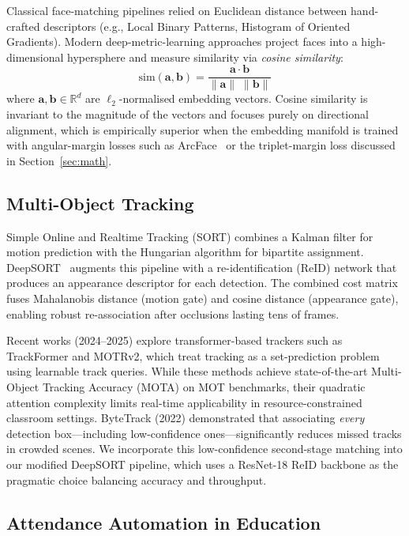 \documentclass[conference, 10pt]{IEEEtran}
\begin{document}
Classical face-matching pipelines relied on Euclidean distance between hand-crafted descriptors
(e.g., Local Binary Patterns, Histogram of Oriented Gradients).  Modern deep-metric-learning
approaches project faces into a high-dimensional hypersphere and measure similarity via
\emph{cosine similarity}:
\begin{equation}
\label{eq:cosine}
    \text{sim}(\mathbf{a}, \mathbf{b})
    = \frac{\mathbf{a} \cdot \mathbf{b}}{\|\mathbf{a}\| \; \|\mathbf{b}\|}
\end{equation}
where $\mathbf{a}, \mathbf{b} \in \mathbb{R}^{d}$ are $\ell_2$-normalised embedding vectors.
Cosine similarity is invariant to the magnitude of the vectors and focuses purely on
directional alignment, which is empirically superior when the embedding manifold is trained
with angular-margin losses such as ArcFace~\cite{ref_arcface} or the triplet-margin loss
discussed in Section~\ref{sec:math}.

\subsection{Multi-Object Tracking}

Simple Online and Realtime Tracking (SORT) combines a Kalman filter for motion prediction with
the Hungarian algorithm for bipartite assignment.  DeepSORT~\cite{ref_deepsort} augments this
pipeline with a re-identification (ReID) network that produces an appearance descriptor for
each detection.  The combined cost matrix fuses Mahalanobis distance (motion gate) and cosine
distance (appearance gate), enabling robust re-association after occlusions lasting tens of
frames.

Recent works (2024--2025) explore transformer-based trackers such as TrackFormer and MOTRv2,
which treat tracking as a set-prediction problem using learnable track queries.  While these
methods achieve state-of-the-art Multi-Object Tracking Accuracy (MOTA) on MOT benchmarks,
their quadratic attention complexity limits real-time applicability in resource-constrained
classroom settings.  ByteTrack (2022) demonstrated that associating \emph{every} detection
box---including low-confidence ones---significantly reduces missed tracks in crowded scenes.
We incorporate this low-confidence second-stage matching into our modified DeepSORT pipeline,
which uses a ResNet-18 ReID backbone as the pragmatic choice balancing accuracy and throughput.

\subsection{Attendance Automation in Education}
\end{document}
